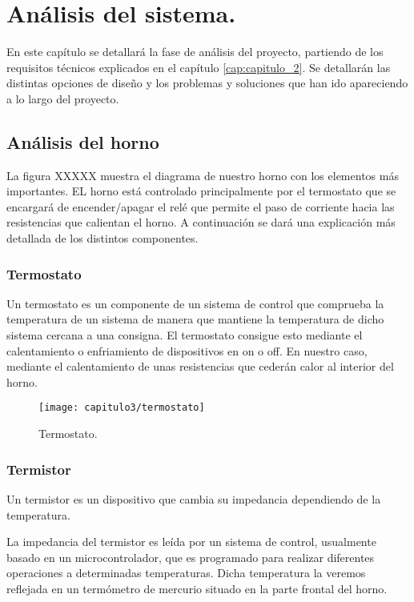 
\chapter{Análisis del sistema.}
\label{cap:capitulo_3}
En este capítulo se detallará la fase de análisis del proyecto, partiendo de los requisitos técnicos explicados en el capítulo \ref{cap:capitulo_2}. Se detallarán las distintas opciones de diseño y los problemas y soluciones que han ido apareciendo a lo largo del proyecto.

\section{Análisis del horno}
La figura XXXXX muestra el diagrama de nuestro horno con los elementos más importantes. EL horno está controlado principalmente por el termostato que se encargará de encender/apagar el relé que permite el paso de corriente hacia las resistencias que calientan el horno. 
A continuación se dará una explicación más detallada de los distintos componentes.

\subsection{Termostato}

Un termostato es un componente de un sistema de control que comprueba la temperatura de un sistema de manera que mantiene la temperatura de dicho sistema cercana a una consigna. El termostato consigue esto mediante el calentamiento o enfriamiento de dispositivos en on o off. En nuestro caso, mediante el calentamiento de unas resistencias que cederán calor al interior del horno. 

\smallskip	
\begin{figure}[H]%
\noindent \begin{centering}
\texttt{[image: capitulo3/termostato]}
\par\end{centering}
\smallskip
\caption{\label{fig:termostato} Termostato.}
\end{figure}


\subsection{Termistor}
Un termistor es un dispositivo que cambia su impedancia dependiendo de la temperatura.

La impedancia del termistor es leída por un sistema de control, usualmente basado en un microcontrolador, que es programado para realizar diferentes operaciones a determinadas temperaturas.
Dicha temperatura la veremos reflejada en un termómetro de mercurio situado en la parte frontal del horno.

